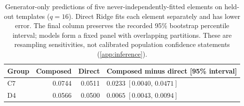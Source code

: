 \begin{table}[t]
\centering
\small
\begin{tabular}{lrrl}
\toprule
Group & Composed & Direct & Composed minus direct [95\% interval] \\
\midrule
C7 & 0.0744 & 0.0511 & $0.0233\;[0.0040,\,0.0471]$ \\
D4 & 0.0566 & 0.0500 & $0.0065\;[0.0043,\,0.0094]$ \\
\bottomrule
\end{tabular}
\caption{Generator-only predictions of five never-independently-fitted elements on held-out templates ($q=16$). Direct Ridge fits each element separately and has lower error. The final column preserves the recorded 95\% bootstrap percentile interval; models form a fixed panel with overlapping partitions. These are resampling sensitivities, not calibrated population confidence statements (\cref{app:inference}).}
\label{tab:generator-transfer}
\end{table}
